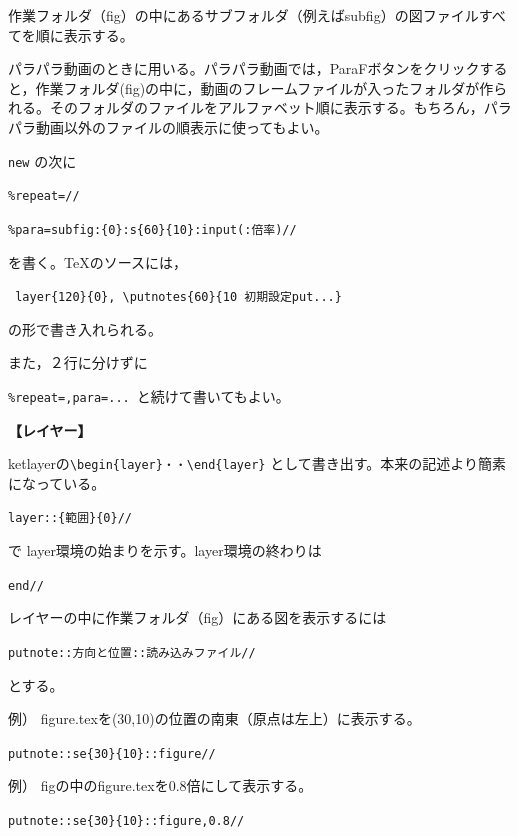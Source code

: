 \documentclass[papersize,a4paper,12pt,uplatex]{jsarticle}
\begin{document}
作業フォルダ（fig）の中にあるサブフォルダ（例えばsubfig）の図ファイルすべてを順に表示する。

 パラパラ動画のときに用いる。パラパラ動画では，ParaFボタンをクリックすると，作業フォルダ(fig)の中に，動画のフレームファイルが入ったフォルダが作られる。そのフォルダのファイルをアルファベット順に表示する。もちろん，パラパラ動画以外のファイルの順表示に使ってもよい。

\verb|new| の次に
 
\hspace{10mm} \verb|%repeat=//|
 
\hspace{10mm} \verb|%para=subfig:{0}:s{60}{10}:input(:倍率)//|

を書く。TeXのソースには，
 
\hspace{10mm}\verb| layer{120}{0}, \putnotes{60}{10 初期設定put...}|

の形で書き入れられる。

また，２行に分けずに

\hspace{10mm} \verb|%repeat=,para=... |と続けて書いてもよい。
 

\vspace{\baselineskip}
{\bf 【レイヤー】}

ketlayerの\verb|\begin{layer}・・\end{layer}| として書き出す。本来の記述より簡素になっている。

\hspace{10mm}\verb|layer::{範囲}{0}//|

で layer環境の始まりを示す。layer環境の終わりは 

\hspace{10mm}\verb|end//|
 
 レイヤーの中に作業フォルダ（fig）にある図を表示するには
 
\hspace{10mm}\verb|putnote::方向と位置::読み込みファイル//|
 
とする。
 
 例） figure.texを(30,10)の位置の南東（原点は左上）に表示する。
 
\hspace{10mm} \verb|putnote::se{30}{10}::figure//|

 例） figの中のfigure.texを0.8倍にして表示する。
 
\hspace{10mm} \verb|putnote::se{30}{10}::figure,0.8//|
 
\end{document}
